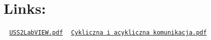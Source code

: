 \hypertarget{describing_awesome_mode_by_james_links_sec}{}\section{Links\+:}\label{describing_awesome_mode_by_james_links_sec}
~\newline
 \href{../../literature/USS2LabVIEW.pdf}{\tt U\+S\+S2\+Lab\+V\+I\+E\+W.\+pdf} ~\newline
 \href{../../literature/Cykliczna i acykliczna komunikacja.pdf}{\tt Cykliczna i acykliczna komunikacja.\+pdf} 